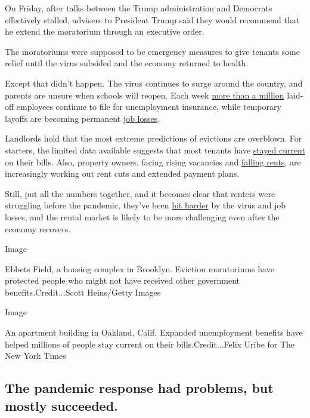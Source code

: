 On Friday, after talks between the Trump administration and Democrats
effectively stalled, advisers to President Trump said they would
recommend that he extend the moratorium through an executive order.

The moratoriums were supposed to be emergency measures to give tenants
some relief until the virus subsided and the economy returned to health.

Except that didn't happen. The virus continues to surge around the
country, and parents are unsure when schools will reopen. Each week
\href{https://www.nytimes3xbfgragh.onion/2020/08/06/business/economy/unemployment-claims.html}{more
than a million} laid-off employees continue to file for unemployment
insurance, while temporary layoffs are becoming permanent
\href{https://www.nytimes3xbfgragh.onion/2020/05/21/business/economy/coronavirus-unemployment-claims.html}{job
losses}.

Landlords hold that the most extreme predictions of evictions are
overblown. For starters, the limited data available suggests that most
tenants have
\href{https://www.nytimes3xbfgragh.onion/2020/05/31/business/economy/coronavirus-rent-landlords-tenants.html}{stayed
current} on their bills. Also, property owners, facing rising vacancies
and
\href{https://www.zillow.com/research/april-2020-market-report-27100/}{falling
rents}, are increasingly working out rent cuts and extended payment
plans.

Still, put all the numbers together, and it becomes clear that renters
were struggling before the pandemic, they've been
\href{https://www.jchs.harvard.edu/blog/how-much-assistance-would-it-take-to-help-renters-affected-by-covid-19/}{hit
harder} by the virus and job losses, and the rental market is likely to
be more challenging even after the economy recovers.

Image

Ebbets Field, a housing complex in Brooklyn. Eviction moratoriums have
protected people who might not have received other government
benefits.Credit...Scott Heins/Getty Images

Image

An apartment building in Oakland, Calif. Expanded unemployment benefits
have helped millions of people stay current on their
bills.Credit...Felix Uribe for The New York Times

\hypertarget{the-pandemic-response-had-problems-but-mostly-succeeded}{%
\subsection{The pandemic response had problems, but mostly
succeeded.}\label{the-pandemic-response-had-problems-but-mostly-succeeded}}

